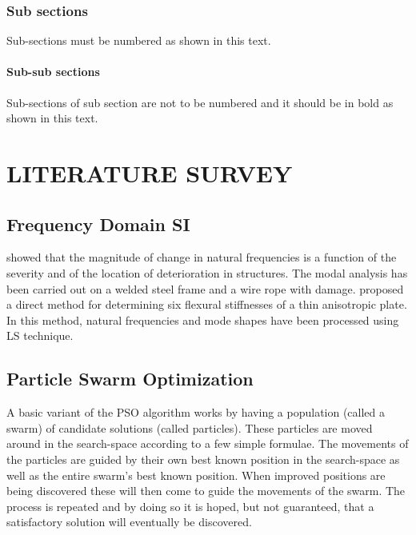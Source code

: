 \documentclass[BTech]{srmuthesis}
\begin{document}
  \subsection{Sub sections} 
  Sub-sections must be numbered as shown in this text. 
  \subsubsection{Sub-sub sections}
  Sub-sections of sub section are not to be numbered and it should be in bold as shown in this text. 
 \chapter{LITERATURE SURVEY}
\section{Frequency Domain SI}
\citet{george} showed that the magnitude of change in natural frequencies is a function of the severity and of the location of deterioration in structures. The modal analysis has been carried out on a welded steel frame and a wire rope with damage. \citet{gredia} proposed a direct method for determining six flexural stiffnesses of a thin anisotropic plate. In this method, natural frequencies \citep{Leo} and mode shapes have been processed using \ac{LS} technique.
\section{Particle Swarm Optimization}
A basic variant of the \ac{PSO} \citep{kenndy} algorithm works by having a population (called a swarm) of candidate solutions (called particles). These particles are moved around in the search-space according to a few simple formulae. The movements of the particles are guided by their own best known position in the search-space as well as the entire swarm's best known position. When improved positions are being discovered these will then come to guide the movements of the swarm. The process is repeated and by doing so it is hoped, but not guaranteed, that a satisfactory solution will eventually be discovered.
\end{document}
